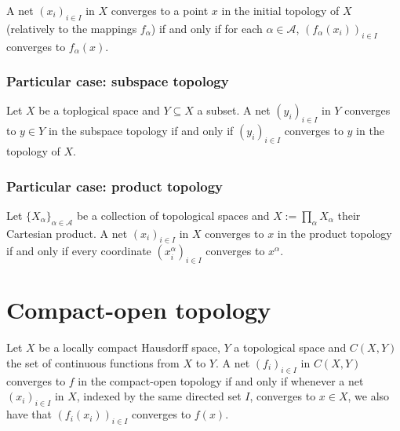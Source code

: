 \documentclass[12pt]{article}
\begin{document}
A net $(x_i)_{i \in I}$ in $X$ converges to a point $x$ in the initial topology of $X$ (relatively to the mappings $f_{\alpha}$) if and only if for each $\alpha \in \mathcal{A}$, $(f_{\alpha}(x_i))_{i \in I}$ converges to $f_{\alpha}(x)$.

\subsubsection{Particular case: subspace topology}

Let $X$ be a toplogical space and $Y \subseteq X$ a subset. A net $(y_i)_{i \in I}$ in $Y$ converges to $y \in Y$ in the subspace topology if and only if $(y_i)_{i \in I}$ converges to $y$ in the topology of $X$.

\subsubsection{Particular case: product topology}

Let $\{X_{\alpha}\}_{\alpha \in \mathcal{A}}$ be a collection of topological spaces and $X := \prod_{\alpha} X_{\alpha}$ their Cartesian product. A net $(x_i)_{i \in I}$ in $X$ converges to $x$ in the product topology if and only if every coordinate $(x_i^{\alpha})_{i \in I}$ converges to $x^{\alpha}$.

\section{Compact-open topology}

Let $X$ be a locally compact Hausdorff space, $Y$ a topological space and $C(X, Y)$ the set of continuous functions from $X$ to $Y$. A net $(f_i)_{i \in I}$ in $C(X, Y)$ converges to $f$ in the compact-open topology if and only if whenever a net $(x_i)_{i \in I}$ in $X$, indexed by the same directed set $I$, converges to $x \in X$, we also have that $(f_i(x_i))_{i \in I}$ converges to $f(x)$.

\end{document}
